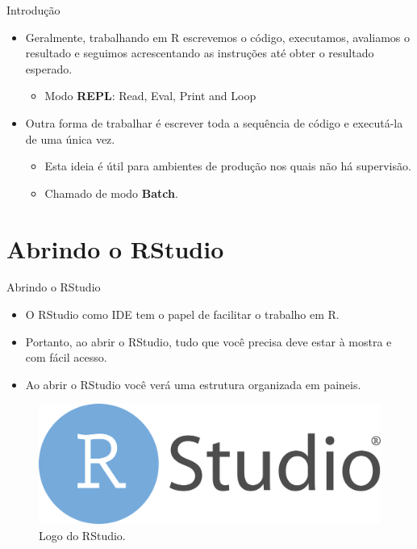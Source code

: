 \documentclass[
  ignorenonframetext,
  serif,
  professionalfont,
  usenames,
  dvipsnames,
  aspectratio = 169]{beamer}
\providecommand{\tightlist}{%
  \setlength{\itemsep}{0pt}\setlength{\parskip}{0pt}}
\renewcommand{\tightlist}{%
  \setlength{\itemsep}{0\baselineskip}
  \setlength{\parskip}{0.25\baselineskip}
}
\def\beginAHalfColumn{\begin{minipage}{0.49\textwidth}}%
\def\endColumns{\end{minipage}}%
\begin{document}
\begin{frame}{Introdução}
\protect\hypertarget{introduuxe7uxe3o-2}{}
\begin{itemize}
\tightlist
\item
  Geralmente, trabalhando em R escrevemos o código, executamos,
  avaliamos o resultado e seguimos acrescentando as instruções até obter
  o resultado esperado.

  \begin{itemize}
  \tightlist
  \item
    Modo \textbf{REPL}: Read, Eval, Print and Loop
  \end{itemize}
\item
  Outra forma de trabalhar é escrever toda a sequência de código e
  executá-la de uma única vez.

  \begin{itemize}
  \tightlist
  \item
    Esta ideia é útil para ambientes de produção nos quais não há
    supervisão.
  \item
    Chamado de modo \textbf{Batch}.
  \end{itemize}
\end{itemize}
\end{frame}

\hypertarget{abrindo-o-rstudio}{%
\section{Abrindo o RStudio}\label{abrindo-o-rstudio}}

\begin{frame}{Abrindo o RStudio}
\protect\hypertarget{abrindo-o-rstudio-1}{}
\beginAHalfColumn

\begin{itemize}
\item
  O RStudio como IDE tem o papel de facilitar o trabalho em R.
\item
  Portanto, ao abrir o RStudio, tudo que você precisa deve estar à
  mostra e com fácil acesso.
\item
  Ao abrir o RStudio você verá uma estrutura organizada em paineis.
\end{itemize}

\endColumns
\beginAHalfColumn

\begin{figure}

{\centering \includegraphics[width=0.6\linewidth]{./img/rstudiologo} 

}

\caption{Logo do RStudio.}\label{fig:unnamed-chunk-3}
\end{figure}

\endColumns
\end{frame}
\end{document}

